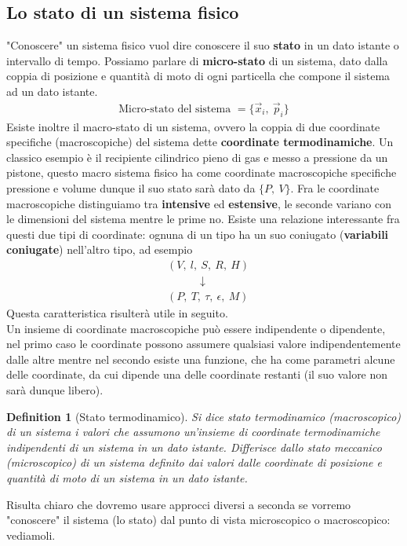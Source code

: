 \documentclass[10pt,a4paper]{article}
\newtheorem{definition}{Definition}
\begin{document}
	\subsection{Lo stato di un sistema fisico}
		"Conoscere" un sistema fisico vuol dire conoscere il suo \textbf{stato} in un dato istante o intervallo di tempo.
		Possiamo parlare di \textbf{micro-stato} di un sistema, dato dalla coppia di posizione e quantità di moto di ogni particella che compone il sistema ad un dato istante. 
		\begin{align*}
			\text{Micro-stato del sistema } = \{ \vec{x}_i,\ \vec{p}_i\}
		\end{align*}
		Esiste inoltre il macro-stato di un sistema, ovvero la coppia di due coordinate specifiche (macroscopiche) del sistema dette \textbf{coordinate termodinamiche}. Un classico esempio è il recipiente cilindrico pieno di gas e messo a pressione da un pistone, questo macro sistema fisico ha come coordinate macroscopiche specifiche pressione e volume dunque il suo stato sarà dato da $\{P,\ V\}$. Fra le coordinate macroscopiche distinguiamo tra \textbf{intensive} ed \textbf{estensive}, le seconde variano con le dimensioni del sistema mentre le prime no. Esiste una relazione interessante fra questi due tipi di coordinate: ognuna di un tipo ha un suo coniugato (\textbf{variabili coniugate}) nell'altro tipo, ad esempio 
		\begin{align*}
			&(V,\ l ,\ S,\ R,\ H)\\
			&\quad \quad \quad \downarrow\\
			&(P,\ T,\ \tau,\ \epsilon,\ M)
		\end{align*}
		Questa caratteristica risulterà utile in seguito.\\
		Un insieme di coordinate macroscopiche può essere indipendente o dipendente, nel primo caso le coordinate possono assumere qualsiasi valore indipendentemente dalle altre mentre nel secondo esiste una funzione, che ha come parametri alcune delle coordinate, da cui dipende una delle coordinate restanti (il suo valore non sarà dunque libero). 
		\begin{definition}[Stato termodinamico]
			Si dice stato termodinamico (macroscopico) di un sistema i valori che assumono un'insieme di coordinate termodinamiche indipendenti di un sistema in un dato istante. Differisce dallo stato meccanico (microscopico) di un sistema definito dai valori dalle coordinate di posizione e quantità di moto di un sistema in un dato istante. 
		\end{definition}
		Risulta chiaro che dovremo usare approcci diversi a seconda se vorremo "conoscere" il sistema (lo stato) dal punto di vista microscopico o macroscopico: vediamoli. 
\end{document}
